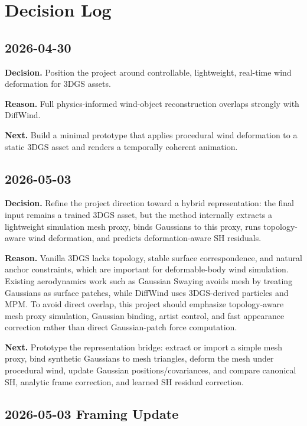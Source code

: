 \documentclass[11pt]{article}
\begin{document}
\section{Decision Log}

\subsection*{2026-04-30}

\textbf{Decision.} Position the project around controllable, lightweight, real-time wind deformation for 3DGS assets.

\textbf{Reason.} Full physics-informed wind-object reconstruction overlaps strongly with DiffWind.

\textbf{Next.} Build a minimal prototype that applies procedural wind deformation to a static 3DGS asset and renders a temporally coherent animation.

\subsection*{2026-05-03}

\textbf{Decision.} Refine the project direction toward a hybrid representation: the final input remains a trained 3DGS asset, but the method internally extracts a lightweight simulation mesh proxy, binds Gaussians to this proxy, runs topology-aware wind deformation, and predicts deformation-aware SH residuals.

\textbf{Reason.} Vanilla 3DGS lacks topology, stable surface correspondence, and natural anchor constraints, which are important for deformable-body wind simulation. Existing aerodynamics work such as Gaussian Swaying avoids mesh by treating Gaussians as surface patches, while DiffWind uses 3DGS-derived particles and MPM. To avoid direct overlap, this project should emphasize topology-aware mesh proxy simulation, Gaussian binding, artist control, and fast appearance correction rather than direct Gaussian-patch force computation.

\textbf{Next.} Prototype the representation bridge: extract or import a simple mesh proxy, bind synthetic Gaussians to mesh triangles, deform the mesh under procedural wind, update Gaussian positions/covariances, and compare canonical SH, analytic frame correction, and learned SH residual correction.

\subsection*{2026-05-03 Framing Update}
\end{document}
